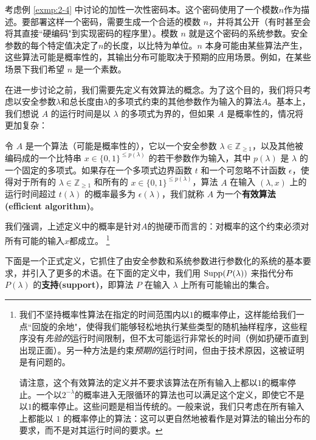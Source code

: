 \begin{example}\label{exmp:2-12}
考虑例 \ref{exmp:2-4} 中讨论的加性一次性密码本。这个密码使用了一个模数$n$作为描述。要部署这样一个密码，需要生成一个合适的模数 $n$，并将其公开（有时甚至会将其直接``硬编码"到实现密码的程序里）。模数 $n$ 就是这个密码的系统参数。安全参数的每个特定值决定了$n$的长度，以比特为单位。$n$ 本身可能由某些算法产生，这些算法可能是概率性的，其输出分布可能取决于预期的应用场景。例如，在某些场景下我们希望 $n$ 是一个素数。
\end{example}

在进一步讨论之前，我们需要先定义有效算法的概念。为了这个目的，我们将只考虑以安全参数$\lambda$和总长度由$\lambda$的多项式约束的其他参数作为输入的算法$A$。基本上，我们想说 $A$ 的运行时间是以 $\lambda$ 的多项式为界的，但如果 $A$ 是概率性的，情况将更加复杂：

\begin{definition}[有效算法]
令 $A$ 是一个算法（可能是概率性的），它以一个安全参数 $\lambda\in\mathbb{Z}_{\geq1}$，以及其他被编码成的一个比特串 $x\in\{0,1\}^{\leq p(\lambda)}$ 的若干参数作为输入，其中 $p(\lambda)$ 是 $\lambda$ 的一个固定的多项式。如果存在一个多项式边界函数 $t$ 和一个可忽略不计函数 $\epsilon$，使得对于所有的 $\lambda\in\mathbb{Z}_{\geq1}$ 和所有的 $x\in\{0,1\}^{\leq p(\lambda)}$，算法 $A$ 在输入 $(\lambda,x)$ 上的运行时间超过 $t(\lambda)$ 的概率最多为 $\epsilon(\lambda)$，我们就称 $A$ 为一个\textbf{有效算法(efficient algorithm)}。
\end{definition}

我们强调，上述定义中的概率是针对$A$的抛硬币而言的：对概率的这个约束必须对所有可能的输入$x$都成立。
\footnote{
\label{foot:2-1}
我们不坚持概率性算法在指定的时间范围内以$1$的概率停止，这样能给我们一点``回旋的余地"，使得我们能够轻松地执行某些类型的随机抽样程序，这些程序没有\emph{先验的}运行时间限制，但不太可能运行非常长的时间（例如扔硬币直到出现正面）。另一种方法是约束\emph{预期的}运行时间，但由于技术原因，这被证明是有问题的。

请注意，这个有效算法的定义并不要求该算法在所有输入上都以$1$的概率停止。一个以$2^{-\lambda}$的概率进入无限循环的算法也可以满足这个定义，即使它不是以$1$的概率停止。这些问题是相当传统的。一般来说，我们只考虑在所有输入上都能以 $1$ 的概率停止的算法：这可以更自然地被看作是对算法的输出分布的要求，而不是对其运行时间的要求。
}

下面是一个正式定义，它抓住了由安全参数和系统参数进行参数化的系统的基本要求，并引入了更多的术语。在下面的定义中，我们用 ${\rm Supp}(P(\lambda))$ 来指代分布 $P(\lambda)$ 的\textbf{支持(support)}，即算法 $P$ 在输入 $\lambda$ 上所有可能输出的集合。

